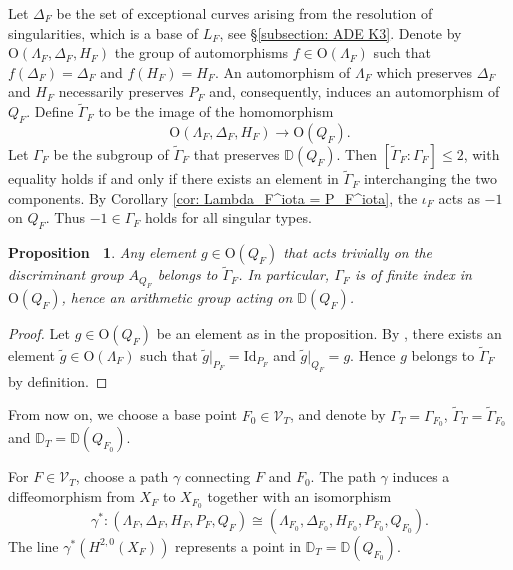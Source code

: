 \documentclass[12pt,reqno,a4paper]{amsart}
\newtheorem{prop}[thm]{Proposition~}
\newtheorem{ques}[thm]{Question~}
\theoremstyle{remark}
\theoremstyle{definition}
\newcommand{\DD}{\mathbb{D}}
\newcommand{\calV}{\mathcal{V}}
\newcommand\Id{\mathrm{Id}}
\newcommand\Or{\mathrm{O}}
\begin{document}
Let $\Delta_{F}$ be the set of exceptional curves arising from the resolution of singularities, which is a base of $L_F$, see \S \ref{subsection: ADE K3}.
Denote by $\Or(\Lambda_F, \Delta_F, H_F)$ the group of automorphisms $f\in \Or(\Lambda_F)$ such that $f(\Delta_F)=\Delta_F$ and $f(H_F)=H_F$.
An automorphism of $\Lambda_{F}$ which preserves $\Delta_{F}$ and $H_{F}$ necessarily preserves $P_{F}$ and, consequently, induces an automorphism of $Q_{F}$. 
Define $\widetilde\Gamma_{F}$ to be the image of the homomorphism 
\begin{equation*}
    \Or(\Lambda_{F}, \Delta_{F},H_{F})\to \Or(Q_{F}).
\end{equation*}
Let $\Gamma_F$ be the subgroup of $\widetilde\Gamma_{F}$ that preserves $\DD(Q_F)$.
Then $[\widetilde{\Gamma}_F : \Gamma_F] \leq 2$, with equality holds if and only if there exists an element in $\widetilde{\Gamma}_F$ interchanging the two components.
By Corollary \ref{cor: Lambda_F^iota = P_F^iota}, the $\iota_F$ acts as $-1$ on $Q_F$. Thus $-1\in\Gamma_F$ holds for all singular types. 

\begin{prop}
Any element $g\in\Or(Q_{F})$ that acts trivially on the discriminant group $A_{Q_{F}}$ belongs to $\widetilde{\Gamma}_{F}$. In particular, $\Gamma_{F}$ is of finite index in $\Or(Q_{F})$, hence an arithmetic group acting on $\DD(Q_{F})$.
\end{prop}
\begin{proof}
    Let $g\in\Or(Q_{F})$ be an element as in the proposition. By \cite[Corollary 1.5.2]{nikulin1979integer}, there exists an element $\widetilde{g}\in \Or(\Lambda_F)$ such that $\widetilde{g}|_{P_F}=\Id_{P_F}$ and $\widetilde{g}|_{Q_F}=g$. Hence $g$ belongs to $\widetilde{\Gamma}_F$ by definition.
\end{proof}



From now on, we choose a base point $F_0\in \calV_T$, and denote by $\Gamma_T=\Gamma_{F_0}$, $\widetilde{\Gamma}_T=\widetilde{\Gamma}_{F_0}$ and $\DD_T=\DD(Q_{F_0})$. 

For $F\in \calV_T$, choose a path $\gamma$ connecting $F$ and $F_0$. 
The path $\gamma$ induces a diffeomorphism from $X_F$ to $X_{F_0}$ together with an isomorphism 
\[
\gamma^*\colon (\Lambda_F, \Delta_F, H_F, P_F, Q_F)\cong (\Lambda_{F_0}, \Delta_{F_0}, H_{F_0}, P_{F_0}, Q_{F_0}).
\]
The line $\gamma^*(H^{2,0}(X_F))$ represents a point in $\DD_T=\DD(Q_{F_0})$.
\end{document}
